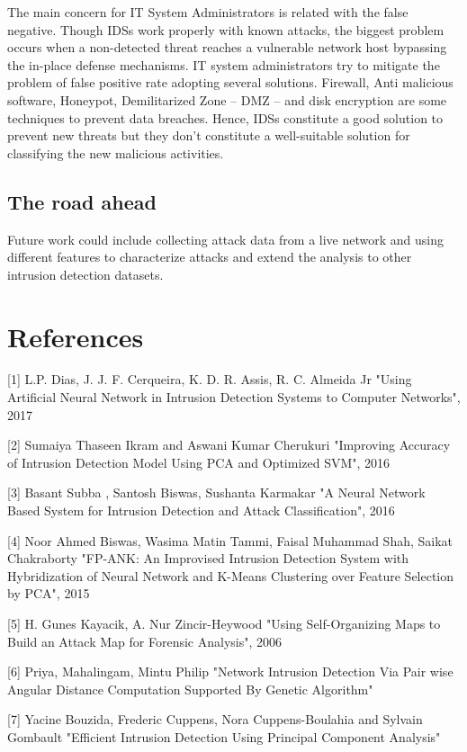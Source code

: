 \documentclass[twocolumn,11pt]{asme2ej}
\begin{document}
The main concern for IT System Administrators is related with the false negative. Though IDSs work properly with known attacks, the biggest problem occurs when a non-detected threat reaches a vulnerable network host bypassing the in-place defense mechanisms. IT system administrators try to mitigate the problem of false positive rate adopting several solutions. Firewall, Anti malicious software, Honeypot, Demilitarized Zone -- DMZ -- and disk encryption are some techniques to prevent data breaches. Hence, IDSs constitute a good solution to prevent new threats but they don't constitute a well-suitable solution for classifying the new malicious activities.

\subsection{The road ahead}

Future work could include collecting attack data from a live network and using different features to characterize attacks and extend the analysis to other intrusion detection datasets.


\section{References}

[1] L.P. Dias, J. J. F. Cerqueira, K. D. R. Assis, R. C. Almeida Jr "Using Artificial Neural Network in Intrusion Detection Systems to Computer Networks", 2017

[2] Sumaiya Thaseen Ikram and Aswani Kumar Cherukuri "Improving Accuracy of Intrusion Detection Model Using PCA and Optimized SVM", 2016

[3] Basant Subba , Santosh Biswas, Sushanta Karmakar "A Neural Network Based System for Intrusion Detection and Attack Classification", 2016

[4] Noor Ahmed Biswas, Wasima Matin Tammi, Faisal Muhammad Shah, Saikat Chakraborty "FP-ANK: An Improvised Intrusion Detection System with Hybridization of Neural Network and K-Means Clustering over Feature Selection by PCA", 2015

[5] H. Gunes Kayacik, A. Nur Zincir-Heywood "Using Self-Organizing Maps to Build an Attack Map for Forensic Analysis", 2006

[6] Priya, Mahalingam, Mintu Philip "Network Intrusion Detection Via Pair wise Angular Distance Computation Supported By Genetic Algorithm"

[7] Yacine Bouzida, Frederic Cuppens, Nora Cuppens-Boulahia and Sylvain Gombault "Efficient Intrusion Detection Using Principal Component Analysis"

\end{document}
